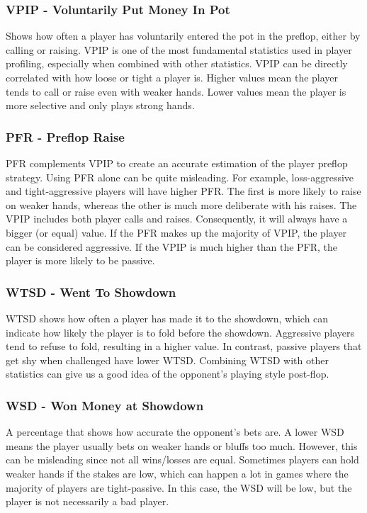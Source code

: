 \subsubsection{VPIP - Voluntarily Put Money In Pot}
Shows how often a player has voluntarily entered the pot in the preflop, either by calling or raising. VPIP is one of the most fundamental statistics used in player profiling, especially when combined with other statistics.
VPIP can be directly correlated with how loose or tight a player is. Higher values mean the player tends to call or raise even with weaker hands. Lower values mean the player is more selective and only plays strong hands.

\subsubsection{PFR - Preflop Raise}
PFR complements VPIP to create an accurate estimation of the player preflop strategy. Using PFR alone can be quite misleading. For example, loss-aggressive and tight-aggressive players will have higher PFR. The first is more likely to raise on weaker hands, whereas the other is much more deliberate with his raises. The VPIP includes both player calls and raises. Consequently, it will always have a bigger (or equal) value. If the PFR makes up the majority of VPIP, the player can be considered aggressive. If the VPIP is much higher than the PFR, the player is more likely to be passive.


\subsubsection{WTSD - Went To Showdown}
WTSD shows how often a player has made it to the showdown, which can indicate how likely the player is to fold before the showdown. Aggressive players tend to refuse to fold, resulting in a higher value. In contrast, passive players that get shy when challenged have lower WTSD. Combining WTSD with other statistics can give us a good idea of the opponent's playing style post-flop. 

\subsubsection{WSD - Won Money at Showdown}
A percentage that shows how accurate the opponent's bets are. A lower WSD means the player usually bets on weaker hands or bluffs too much. However, this can be misleading since not all wins/losses are equal. Sometimes players can hold weaker hands if the stakes are low, which can happen a lot in games where the majority of players are tight-passive. In this case, the WSD will be low, but the player is not necessarily a bad player. 

